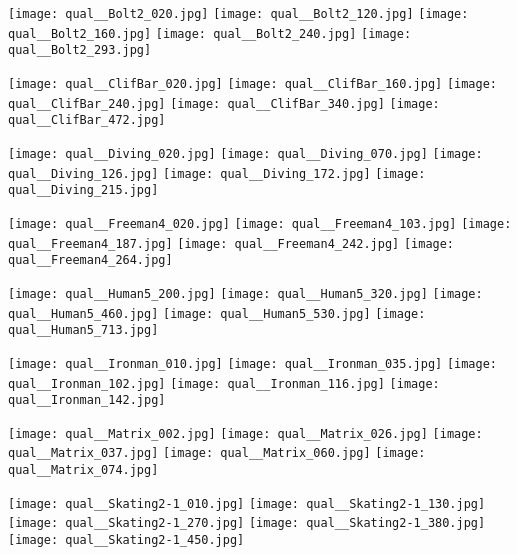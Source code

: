 \documentclass[10pt,twocolumn,letterpaper]{article}
\begin{document}
\begin{figure*}
\begin{center}
\texttt{[image: qual\_\_Bolt2\_020.jpg]}
\texttt{[image: qual\_\_Bolt2\_120.jpg]}
\texttt{[image: qual\_\_Bolt2\_160.jpg]}
\texttt{[image: qual\_\_Bolt2\_240.jpg]}
\texttt{[image: qual\_\_Bolt2\_293.jpg]}

\texttt{[image: qual\_\_ClifBar\_020.jpg]}
\texttt{[image: qual\_\_ClifBar\_160.jpg]}
\texttt{[image: qual\_\_ClifBar\_240.jpg]}
\texttt{[image: qual\_\_ClifBar\_340.jpg]}
\texttt{[image: qual\_\_ClifBar\_472.jpg]}

\texttt{[image: qual\_\_Diving\_020.jpg]}
\texttt{[image: qual\_\_Diving\_070.jpg]}
\texttt{[image: qual\_\_Diving\_126.jpg]}
\texttt{[image: qual\_\_Diving\_172.jpg]}
\texttt{[image: qual\_\_Diving\_215.jpg]}

\texttt{[image: qual\_\_Freeman4\_020.jpg]}
\texttt{[image: qual\_\_Freeman4\_103.jpg]}
\texttt{[image: qual\_\_Freeman4\_187.jpg]}
\texttt{[image: qual\_\_Freeman4\_242.jpg]}
\texttt{[image: qual\_\_Freeman4\_264.jpg]}

\texttt{[image: qual\_\_Human5\_200.jpg]}
\texttt{[image: qual\_\_Human5\_320.jpg]}
\texttt{[image: qual\_\_Human5\_460.jpg]}
\texttt{[image: qual\_\_Human5\_530.jpg]}
\texttt{[image: qual\_\_Human5\_713.jpg]}

\texttt{[image: qual\_\_Ironman\_010.jpg]}
\texttt{[image: qual\_\_Ironman\_035.jpg]}
\texttt{[image: qual\_\_Ironman\_102.jpg]}
\texttt{[image: qual\_\_Ironman\_116.jpg]}
\texttt{[image: qual\_\_Ironman\_142.jpg]}

\texttt{[image: qual\_\_Matrix\_002.jpg]}
\texttt{[image: qual\_\_Matrix\_026.jpg]}
\texttt{[image: qual\_\_Matrix\_037.jpg]}
\texttt{[image: qual\_\_Matrix\_060.jpg]}
\texttt{[image: qual\_\_Matrix\_074.jpg]}

\texttt{[image: qual\_\_Skating2-1\_010.jpg]}
\texttt{[image: qual\_\_Skating2-1\_130.jpg]}
\texttt{[image: qual\_\_Skating2-1\_270.jpg]}
\texttt{[image: qual\_\_Skating2-1\_380.jpg]}
\texttt{[image: qual\_\_Skating2-1\_450.jpg]}


\end{center}
\end{figure*}
\end{document}
